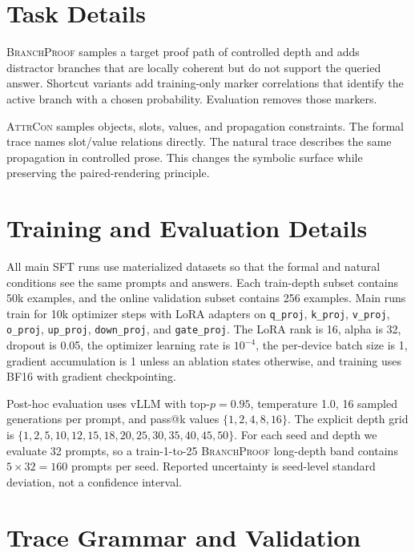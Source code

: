 \documentclass[11pt]{article}
\newcommand{\branchproof}{\textsc{BranchProof}}
\newcommand{\attrcon}{\textsc{AttrCon}}
\begin{document}
\clearpage
\appendix

\section{Task Details}
\label{sec:task-details}

\branchproof{} samples a target proof path of controlled depth and adds
distractor branches that are locally coherent but do not support the queried
answer. Shortcut variants add training-only marker correlations that identify
the active branch with a chosen probability. Evaluation removes those markers.

\attrcon{} samples objects, slots, values, and propagation constraints. The
formal trace names slot/value relations directly. The natural trace describes
the same propagation in controlled prose. This changes the symbolic surface
while preserving the paired-rendering principle.

\section{Training and Evaluation Details}
\label{sec:training-details}

All main SFT runs use materialized datasets so that the formal and natural
conditions see the same prompts and answers. Each train-depth subset contains
50k examples, and the online validation subset contains 256 examples. Main runs
train for 10k optimizer steps with LoRA adapters on \texttt{q\_proj},
\texttt{k\_proj}, \texttt{v\_proj}, \texttt{o\_proj}, \texttt{up\_proj},
\texttt{down\_proj}, and \texttt{gate\_proj}. The LoRA rank is 16, alpha is 32,
dropout is 0.05, the optimizer learning rate is $10^{-4}$, the per-device batch
size is 1, gradient accumulation is 1 unless an ablation states otherwise, and
training uses BF16 with gradient checkpointing.

Post-hoc evaluation uses vLLM with top-$p=0.95$, temperature 1.0, 16 sampled
generations per prompt, and pass@k values $\{1,2,4,8,16\}$. The explicit depth
grid is $\{1,2,5,10,12,15,18,20,25,30,35,40,45,50\}$. For each seed and depth
we evaluate 32 prompts, so a train-1-to-25 \branchproof{} long-depth band
contains $5 \times 32=160$ prompts per seed. Reported uncertainty is seed-level
standard deviation, not a confidence interval.

\section{Trace Grammar and Validation}
\label{sec:grammar}
\end{document}
